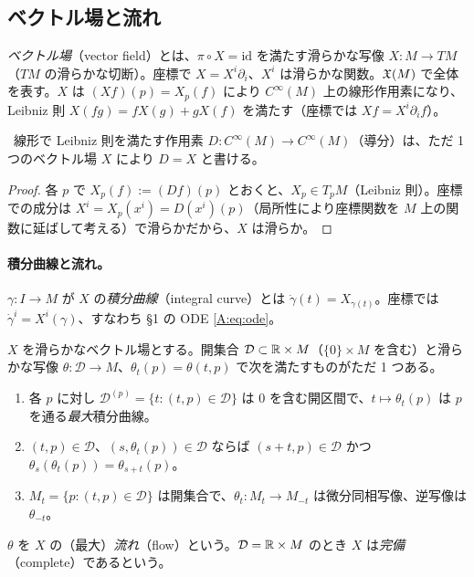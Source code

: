 \subsection{ベクトル場と流れ}
\begin{defn}
\emph{ベクトル場}（vector field）とは、$\pi\circ X=\mathrm{id}$ を満たす滑らかな写像 $X:M\to TM$（$TM$ の滑らかな切断）。座標で $X=X^i\partial_i$、$X^i$ は滑らかな関数。$\mathfrak X(M)$ で全体を表す。$X$ は $(Xf)(p)=X_p(f)$ により $C^\infty(M)$ 上の線形作用素になり、Leibniz 則 $X(fg)=fX(g)+gX(f)$ を満たす（座標では $Xf=X^i\partial_if$）。
\end{defn}

\begin{prop}\label{A:prop:derivation}
\tP\ 線形で Leibniz 則を満たす作用素 $D:C^\infty(M)\to C^\infty(M)$（導分）は、ただ 1 つのベクトル場 $X$ により $D=X$ と書ける。
\end{prop}
\begin{proof}
各 $p$ で $X_p(f):=(Df)(p)$ とおくと、$X_p\in T_pM$（Leibniz 則）。座標での成分は $X^i=X_p(x^i)=D(x^i)(p)$（局所性により座標関数を $M$ 上の関数に延ばして考える）で滑らかだから、$X$ は滑らか。
\end{proof}

\paragraph{積分曲線と流れ。}$\gamma:I\to M$ が $X$ の\emph{積分曲線}（integral curve）とは $\dot\gamma(t)=X_{\gamma(t)}$。座標では $\dot\gamma^i=X^i(\gamma)$、すなわち §1 の ODE \eqref{A:eq:ode}。

\begin{thm}[流れの基本定理]\label{A:thm:flow}
$X$ を滑らかなベクトル場とする。開集合 $\mathcal D\subset\mathbb R\times M$（$\{0\}\times M$ を含む）と滑らかな写像 $\theta:\mathcal D\to M$、$\theta_t(p)=\theta(t,p)$ で次を満たすものがただ 1 つある。
\begin{enumerate}
\item 各 $p$ に対し $\mathcal D^{(p)}=\{t:(t,p)\in\mathcal D\}$ は $0$ を含む開区間で、$t\mapsto\theta_t(p)$ は $p$ を通る\emph{最大}積分曲線。
\item $(t,p)\in\mathcal D$、$(s,\theta_t(p))\in\mathcal D$ ならば $(s+t,p)\in\mathcal D$ かつ $\theta_s(\theta_t(p))=\theta_{s+t}(p)$。
\item $M_t=\{p:(t,p)\in\mathcal D\}$ は開集合で、$\theta_t:M_t\to M_{-t}$ は微分同相写像、逆写像は $\theta_{-t}$。
\end{enumerate}
$\theta$ を $X$ の（最大）\emph{流れ}（flow）という。$\mathcal D=\mathbb R\times M$ のとき $X$ は\emph{完備}（complete）であるという。
\end{thm}

